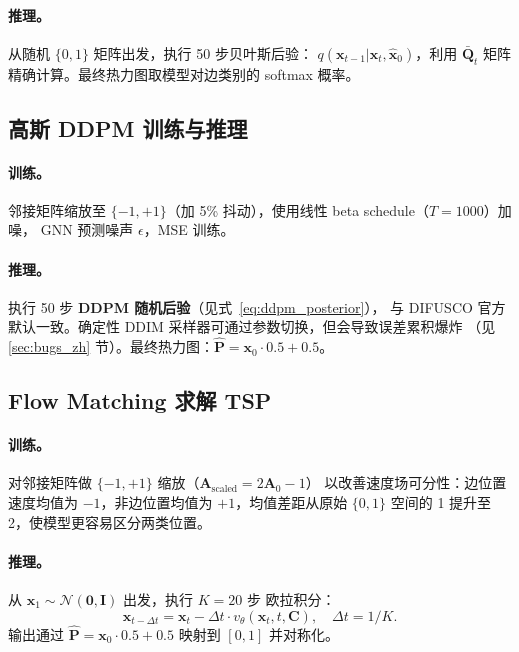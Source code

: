 \documentclass[11pt,a4paper]{article}
\begin{document}
\paragraph{推理。}
从随机 $\{0,1\}$ 矩阵出发，执行 50 步贝叶斯后验：
$q(\mathbf{x}_{t-1}|\mathbf{x}_t,\hat{\mathbf{x}}_0)$，利用 $\bar{\mathbf{Q}}_t$
矩阵精确计算。最终热力图取模型对边类别的 softmax 概率。

\subsection{高斯 DDPM 训练与推理}
\paragraph{训练。}
邻接矩阵缩放至 $\{-1,+1\}$（加 5\% 抖动），使用线性 beta schedule（$T=1000$）加噪，
GNN 预测噪声 $\epsilon$，MSE 训练。

\paragraph{推理。}
执行 50 步 \textbf{DDPM 随机后验}（见式~\ref{eq:ddpm_posterior}），
与 DIFUSCO 官方默认一致。确定性 DDIM 采样器可通过参数切换，但会导致误差累积爆炸
（见 \ref{sec:bugs_zh} 节）。最终热力图：$\hat{\mathbf{P}} = \mathbf{x}_0 \cdot 0.5 + 0.5$。

\subsection{Flow Matching 求解 TSP}
\label{sec:fm_method_zh}
\paragraph{训练。}
对邻接矩阵做 $\{-1,+1\}$ 缩放（$\mathbf{A}_\text{scaled} = 2\mathbf{A}_0 - 1$）
以改善速度场可分性：边位置速度均值为 $-1$，非边位置均值为 $+1$，均值差距从原始
$\{0,1\}$ 空间的 1 提升至 2，使模型更容易区分两类位置。

\paragraph{推理。}
从 $\mathbf{x}_1 \sim \mathcal{N}(\mathbf{0},\mathbf{I})$ 出发，执行 $K=20$ 步
欧拉积分：
\begin{equation}
  \mathbf{x}_{t-\Delta t} = \mathbf{x}_t
    - \Delta t \cdot v_\theta(\mathbf{x}_t, t, \mathbf{C}), \quad \Delta t = 1/K.
\end{equation}
输出通过 $\hat{\mathbf{P}} = \mathbf{x}_0 \cdot 0.5 + 0.5$ 映射到 $[0,1]$ 并对称化。
\end{document}
